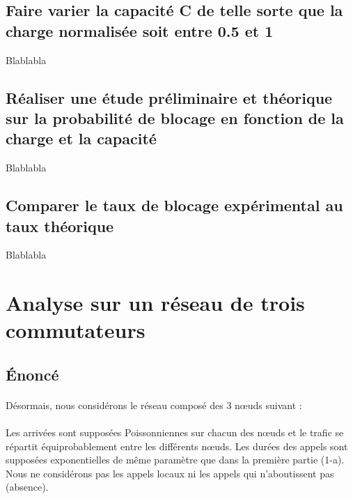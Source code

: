         \subsection{Faire varier la capacité C de telle sorte que la charge normalisée soit entre 0.5 et 1}
Blablabla
%
        \subsection{Réaliser une étude préliminaire et théorique sur la probabilité de blocage en fonction de la charge et la capacité}
Blablabla
%
        \subsection{Comparer le taux de blocage expérimental au taux théorique}
Blablabla
%
    \clearpage
%
%
%
    \section{Analyse sur un réseau de trois commutateurs}
%
        \subsection{Énoncé}
%
            \paragraph{}
Désormais, nous considérons le réseau composé des 3 nœuds suivant :
%
            \paragraph{}
Les arrivées sont supposées Poissonniennes sur chacun des nœuds et le trafic se répartit équiprobablement entre les différents nœuds.
Les durées des appels sont supposées exponentielles de même paramètre que dans la première partie (1-a).
Nous ne considérons pas les appels locaux ni les appels qui n'aboutissent pas (absence).
%
